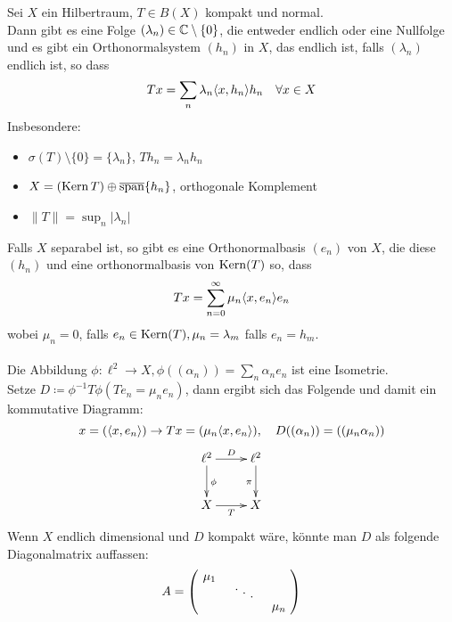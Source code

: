 \begin{satz}  \label{satz:19.11.b}
	Sei $X$ ein Hilbertraum, $T \in B(X)$ kompakt und normal. \\
	Dann gibt es eine Folge $(\lambda_{n}) \in \mathbb{C} \setminus \{ 0 \}$, die entweder endlich oder eine Nullfolge und es gibt ein Orthonormalsystem $(h_{n})$ in $X$, das endlich ist, falls $(\lambda_{n})$ endlich ist, so dass
	\[ Tx = \sum_{n} \lambda_{n} \langle x , h_{n} \rangle h_{n} \quad \forall x \in X \]
	Insbesondere:
	\begin{itemize}
		\item $\sigma(T) \setminus \{ 0 \} = \{ \lambda_{n} \}$, $T h_{n} = \lambda_{n} h_{n}$
		\item $X = \left( \mathop{\rm Kern}\nolimits T \right) \oplus \overline{\operatorname{span}} \{ h_{n} \}$, orthogonale Komplement
		\item $\| T \| = \sup_{n} | \lambda_{n} |$ 
	\end{itemize}
\end{satz}

\begin{bemerkung*}
	Falls $X$ separabel ist, so gibt es eine Orthonormalbasis $(e_{n})$ von $X$, die diese $(h_{n})$ und eine orthonormalbasis von $\mathop{\rm Kern}\nolimits(T)$ so, dass 
	\[ T x = \sum_{n = 0}^{\infty} \mu_{n} \langle x , e_{n} \rangle e_{n} \]
	wobei $\mu_{n} = 0$, falls $e_{n} \in \mathop{\rm Kern}\nolimits(T), \mu_{n} = \lambda_{m}$ falls $e_{n} = h_{m}$. \\ \\  
	Die Abbildung $\phi \colon \ell^{2} \rightarrow X, \phi \left( (\alpha_{n}) \right) = \sum_{n} \alpha_{n} e_{n}$ ist eine Isometrie. \\
	Setze $D \coloneqq \phi^{-1} T \phi ( T e_{n} = \mu_{n} e_{n} )$, dann ergibt sich das Folgende und damit ein kommutative Diagramm:
	\[ x = (\langle x , e_{n} \rangle) \rightarrow T x = ( \mu_{n} \langle x , e_{n} \rangle ), \quad D( (\alpha_{n}) ) = ( (\mu_{n} \alpha_{n}) )\]
	\[ \begin{xy} \xymatrix{
			\ell^{2} \ar[r]^{D} \ar[d]^{\phi}  &  \ell^{2} \ar[d]_{\pi} \\
			X 		 \ar[r]_{T} 		  		   &  X		
	} \end{xy} \]
	Wenn $X$ endlich dimensional und $D$ kompakt wäre, könnte man $D$ als folgende Diagonalmatrix auffassen:
		\[ A = \begin{pmatrix}
					\diagentry{\mu_{1}}\\
					&\diagentry{\xddots}\\
					&&\diagentry{\mu_{n}}\\
				\end{pmatrix} 
		\] 
\end{bemerkung*}
 

